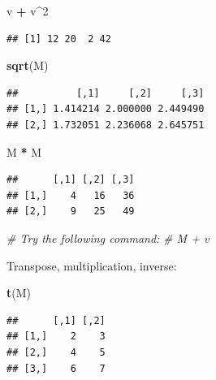 \documentclass[]{book}
\newenvironment{Shaded}{\begin{snugshade}}{\end{snugshade}}
\newcommand{\CommentTok}[1]{\textcolor[rgb]{0.56,0.35,0.01}{\textit{#1}}}
\newcommand{\DecValTok}[1]{\textcolor[rgb]{0.00,0.00,0.81}{#1}}
\newcommand{\KeywordTok}[1]{\textcolor[rgb]{0.13,0.29,0.53}{\textbf{#1}}}
\newcommand{\NormalTok}[1]{#1}
\newcommand{\OperatorTok}[1]{\textcolor[rgb]{0.81,0.36,0.00}{\textbf{#1}}}
\newcommand{\StringTok}[1]{\textcolor[rgb]{0.31,0.60,0.02}{#1}}
\begin{document}
\begin{Shaded}
\begin{Highlighting}[]
\NormalTok{v }\OperatorTok{+}\StringTok{ }\NormalTok{v}\OperatorTok{^}\DecValTok{2}
\end{Highlighting}
\end{Shaded}

\begin{verbatim}
## [1] 12 20  2 42
\end{verbatim}

\begin{Shaded}
\begin{Highlighting}[]
\KeywordTok{sqrt}\NormalTok{(M)}
\end{Highlighting}
\end{Shaded}

\begin{verbatim}
##          [,1]     [,2]     [,3]
## [1,] 1.414214 2.000000 2.449490
## [2,] 1.732051 2.236068 2.645751
\end{verbatim}

\begin{Shaded}
\begin{Highlighting}[]
\NormalTok{M }\OperatorTok{*}\StringTok{ }\NormalTok{M}
\end{Highlighting}
\end{Shaded}

\begin{verbatim}
##      [,1] [,2] [,3]
## [1,]    4   16   36
## [2,]    9   25   49
\end{verbatim}

\begin{Shaded}
\begin{Highlighting}[]
\CommentTok{# Try the following command:}
\CommentTok{# M + v}
\end{Highlighting}
\end{Shaded}

Transpose, multiplication, inverse:

\begin{Shaded}
\begin{Highlighting}[]
\KeywordTok{t}\NormalTok{(M)}
\end{Highlighting}
\end{Shaded}

\begin{verbatim}
##      [,1] [,2]
## [1,]    2    3
## [2,]    4    5
## [3,]    6    7
\end{verbatim}

\begin{Shaded}
\end{Shaded}
\end{document}
